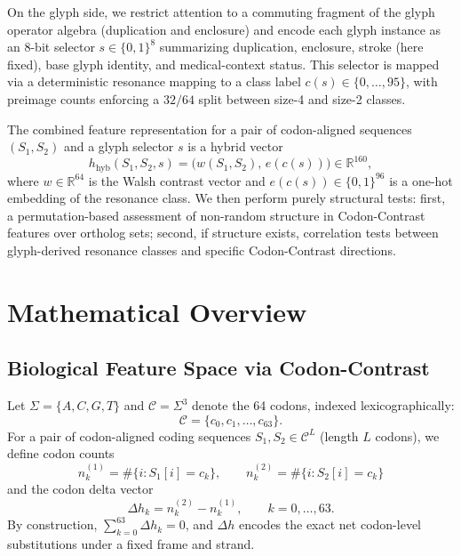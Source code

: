 \documentclass[11pt]{article}
\begin{document}
On the glyph side, we restrict attention to a commuting fragment of the glyph operator algebra (duplication and enclosure) and encode each glyph instance as an 8-bit selector $s\in\{0,1\}^8$ summarizing duplication, enclosure, stroke (here fixed), base glyph identity, and medical-context status. This selector is mapped via a deterministic resonance mapping to a class label $c(s)\in\{0,\dots,95\}$, with preimage counts enforcing a $32/64$ split between size-4 and size-2 classes.\cite{glyphengine}

The combined feature representation for a pair of codon-aligned sequences $(S_1,S_2)$ and a glyph selector $s$ is a hybrid vector
\[
  h_{\text{hyb}}(S_1,S_2,s) = \bigl(w(S_1,S_2),\, e(c(s))\bigr) \in \mathbb{R}^{160},
\]
where $w\in\mathbb{R}^{64}$ is the Walsh contrast vector and $e(c(s))\in\{0,1\}^{96}$ is a one-hot embedding of the resonance class. We then perform purely structural tests: first, a permutation-based assessment of non-random structure in Codon-Contrast features over ortholog sets; second, if structure exists, correlation tests between glyph-derived resonance classes and specific Codon-Contrast directions.

\section{Mathematical Overview}

\subsection{Biological Feature Space via Codon-Contrast}

Let $\Sigma = \{A,C,G,T\}$ and $\mathcal{C} = \Sigma^3$ denote the 64 codons, indexed lexicographically:
\begin{equation}
 \mathcal{C} = \{c_0, c_1,\dots, c_{63}\}.
\end{equation}
For a pair of codon-aligned coding sequences $S_1,S_2 \in \mathcal{C}^{L}$ (length $L$ codons), we define codon counts
\begin{equation}
  n_k^{(1)} = \#\{i : S_1[i] = c_k\},\qquad
  n_k^{(2)} = \#\{i : S_2[i] = c_k\}
\end{equation}
and the codon delta vector
\begin{equation}
  \Delta h_k = n_k^{(2)} - n_k^{(1)},\qquad k = 0,\dots,63.
\end{equation}
By construction, $\sum_{k=0}^{63} \Delta h_k = 0$, and $\Delta h$ encodes the exact net codon-level substitutions under a fixed frame and strand.\cite{codoncontrast}
\end{document}
